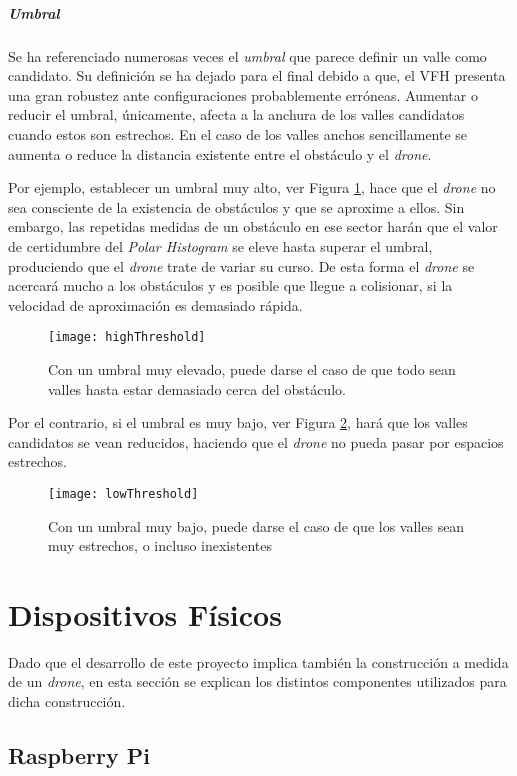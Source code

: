 \subparagraph{Umbral}
Se ha referenciado numerosas veces el \textit{umbral} que parece definir un valle como candidato. Su definición se ha dejado para el final debido a que, el VFH presenta una gran robustez ante configuraciones probablemente erróneas. Aumentar o reducir el umbral, únicamente, afecta a la anchura de los valles candidatos cuando estos son estrechos. En el caso de los valles anchos sencillamente se aumenta o reduce la distancia existente entre el obstáculo y el \emph{drone}.

Por ejemplo, establecer un umbral muy alto, ver Figura \ref{fig:highThreshold}, hace que el \emph{drone} no sea consciente de la existencia de obstáculos y que se aproxime a ellos. Sin embargo, las repetidas medidas de un obstáculo en ese sector harán que el valor de certidumbre del \emph{Polar Histogram} se eleve hasta superar el umbral, produciendo que el \emph{drone} trate de variar su curso. De esta forma el \emph{drone} se acercará mucho a los obstáculos y es posible que llegue a colisionar, si la velocidad de aproximación es demasiado rápida. 
 \begin{figure}
	\centering
	\texttt{[image: highThreshold]}
	\caption[Umbral elevado.]{Con un umbral muy elevado, puede darse el caso de que todo sean valles hasta estar demasiado cerca del obstáculo.}\label{fig:highThreshold}
\end{figure}

Por el contrario, si el umbral es muy bajo, ver Figura \ref{fig:lowThreshold}, hará que los valles candidatos se vean reducidos, haciendo que el \emph{drone} no pueda pasar por espacios estrechos.
 \begin{figure}
	\centering
	\texttt{[image: lowThreshold]}
	\caption[Umbral bajo.]{Con un umbral muy bajo, puede darse el caso de que los valles sean muy estrechos, o incluso inexistentes}\label{fig:lowThreshold}
\end{figure}



\section{Dispositivos Físicos}

Dado que el desarrollo de este proyecto implica también la construcción a medida de un \emph{drone}, en esta sección se explican los distintos componentes utilizados para dicha construcción. 

\subsection{Raspberry Pi}


